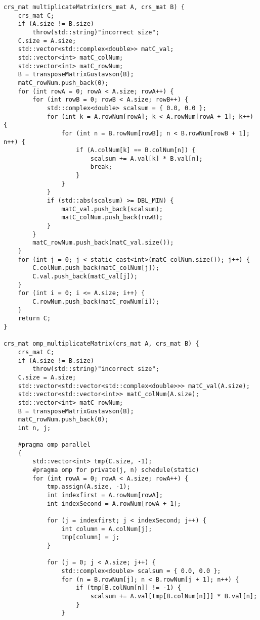\documentclass{report}
\begin{document}
\begin{lstlisting}
crs_mat multiplicateMatrix(crs_mat A, crs_mat B) {
    crs_mat C;
    if (A.size != B.size)
        throw(std::string)"incorrect size";
    C.size = A.size;
    std::vector<std::complex<double>> matC_val;
    std::vector<int> matC_colNum;
    std::vector<int> matC_rowNum;
    B = transposeMatrixGustavson(B);
    matC_rowNum.push_back(0);
    for (int rowA = 0; rowA < A.size; rowA++) {
        for (int rowB = 0; rowB < A.size; rowB++) {
            std::complex<double> scalsum = { 0.0, 0.0 };
            for (int k = A.rowNum[rowA]; k < A.rowNum[rowA + 1]; k++) {
                for (int n = B.rowNum[rowB]; n < B.rowNum[rowB + 1]; n++) {
                    if (A.colNum[k] == B.colNum[n]) {
                        scalsum += A.val[k] * B.val[n];
                        break;
                    }
                }
            }
            if (std::abs(scalsum) >= DBL_MIN) {
                matC_val.push_back(scalsum);
                matC_colNum.push_back(rowB);
            }
        }
        matC_rowNum.push_back(matC_val.size());
    }
    for (int j = 0; j < static_cast<int>(matC_colNum.size()); j++) {
        C.colNum.push_back(matC_colNum[j]);
        C.val.push_back(matC_val[j]);
    }
    for (int i = 0; i <= A.size; i++) {
        C.rowNum.push_back(matC_rowNum[i]);
    }
    return C;
}

crs_mat omp_multiplicateMatrix(crs_mat A, crs_mat B) {
    crs_mat C;
    if (A.size != B.size)
        throw(std::string)"incorrect size";
    C.size = A.size;
    std::vector<std::vector<std::complex<double>>> matC_val(A.size);
    std::vector<std::vector<int>> matC_colNum(A.size);
    std::vector<int> matC_rowNum;
    B = transposeMatrixGustavson(B);
    matC_rowNum.push_back(0);
    int n, j;

    #pragma omp parallel
    {
        std::vector<int> tmp(C.size, -1);
        #pragma omp for private(j, n) schedule(static)
        for (int rowA = 0; rowA < A.size; rowA++) {
            tmp.assign(A.size, -1);
            int indexfirst = A.rowNum[rowA];
            int indexSecond = A.rowNum[rowA + 1];

            for (j = indexfirst; j < indexSecond; j++) {
                int column = A.colNum[j];
                tmp[column] = j;
            }

            for (j = 0; j < A.size; j++) {
                std::complex<double> scalsum = { 0.0, 0.0 };
                for (n = B.rowNum[j]; n < B.rowNum[j + 1]; n++) {
                    if (tmp[B.colNum[n]] != -1) {
                        scalsum += A.val[tmp[B.colNum[n]]] * B.val[n];
                    }
                }


\end{lstlisting}
\end{document}
